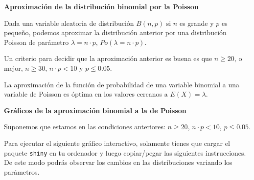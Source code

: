 \documentclass[]{book}
\begin{document}
\textbf{Aproximación de la distribución binomial por la Poisson}

Dada una variable aleatoria de distribución \(B(n,p)\) si \(n\) es grande y \(p\) es pequeño, podemos aproximar la distribución anterior por una distribución Poisson de parámetro \(\lambda=n\cdot p\), \(Po(\lambda = n\cdot p)\).

Un criterio para decidir que la aproximación anterior es buena es que
\(n\geq 20\), o mejor, \(n\geq 30\), \(n\cdot p < 10\) y \(p\leq 0.05.\)

La aproximación de la función de probabilidad de una variable binomial a una variable de Poisson es óptima en los valores cercanos a \(E(X)=\lambda\).

\textbf{Gráficos de la aproximación binomial a la de Poisson}

Suponemos que estamos en las condiciones anteriores: \(n\geq 20\), \(n\cdot p < 10\), \(p\leq 0.05\).

Para ejecutar el siguiente gráfico interactivo, solamente tienes que cargar el paquete \texttt{shiny} en tu ordenador y luego copiar/pegar las siguientes instrucciones. De este modo podrás observar los cambios en las distribuciones variando los parámetros.
\end{document}
